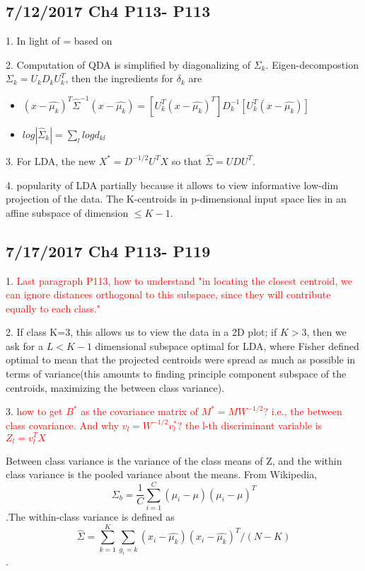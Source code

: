 \documentclass[a4paper, 12pt]{article}
\begin{document}
\subsection*{7/12/2017 Ch4 P113- P113 }

1. In light of = based on

2. Computation of QDA is simplified by diagonalizing of $\Sigma_k$. Eigen-decompostion $\Sigma_k=U_kD_kU^T_k$, then the ingredients for $\delta_k$ are 
\begin{itemize}
	\item $(x-\hat{\mu_k})^T\hat{\Sigma}^{-1}(x-\hat{\mu_k})=[U^T_k(x-\hat{\mu_k})^T]D_k^{-1}[U^T_k(x-\hat{\mu_k})]$
	\item $log|\hat{\Sigma}_k|=\sum_{l}log d_{kl}$
\end{itemize}

3. For LDA, the new $X^*=D^{-1/2}U^TX$ so that $\hat{\Sigma}=UDU^T$.

4. popularity of LDA partially because it allows to view informative low-dim projection of the data. The K-centroids in p-dimensional input space lies in an affine subspace of dimension $\le K-1$.

\subsection*{7/17/2017 Ch4 P113- P119 }

1. \textcolor{red}{Last paragraph P113, how to understand "in locating the closest centroid, we can ignore distances orthogonal to this subspace, since they will contribute equally to each class."}

2. If class K=3, this allows us to view the data in a 2D plot; if $K > 3$, then we ask for a $L < K-1$ dimensional subspace optimal for LDA, where Fisher defined optimal to mean that the projected centroids were spread as much as possible in terms of variance(this amounts to finding principle component subspace of the centroids, maximizing the between class variance).

3. \textcolor{red}{how to get $B^*$ as the covariance matrix of $M^*= MW^{-1/2}$? i.e., the between class covariance. And why $v_l=W^{-1/2}v_l^*$? the l-th discriminant variable is $Z_l=v_l^TX$}

Between class variance is the variance of the class means of Z, and the within class variance is the pooled variance about the means. From Wikipedia, $$\Sigma_b = \frac{1}{C} \sum_{i=1}^C (\mu_i-\mu) (\mu_i-\mu)^T$$.The within-class variance is defined as $$\hat{\Sigma}=\sum_{k=1}^{K}\sum_{g_i=k}(x_i-\hat{\mu_k})(x_i-\hat{\mu_k})^T/(N-K)$$.
\end{document}
